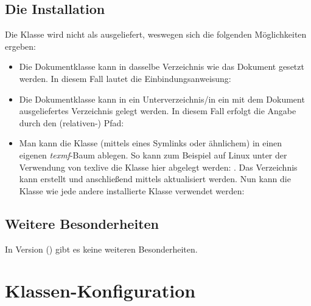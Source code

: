 \documentclass[useartcl,notoc]{sopra-paper}
\begin{document}
\subsection{Die Installation}
    Die Klasse wird nicht als  ausgeliefert, weswegen sich die
    folgenden Möglichkeiten ergeben:
    \begin{itemize}
        \item Die Dokumentklasse kann in dasselbe Verzeichnis wie das Dokument
                gesetzt werden. In diesem Fall lautet die Einbindungsanweisung:
        \item Die Dokumentklasse kann in ein Unterverzeichnis/in ein mit
                dem Dokument ausgeliefertes Verzeichnis gelegt werden. In
                diesem Fall erfolgt die Angabe durch den (relativen-) Pfad:
        \item Man kann die Klasse (mittels eines Symlinks oder ähnlichem)
              in einen eigenen \emph{texmf}-Baum ablegen.
              So kann zum Beispiel auf Linux unter der Verwendung von texlive
              die Klasse hier abgelegt werden: .
              Das Verzeichnis kann erstellt und anschließend mittels
               aktualisiert werden. Nun kann
              die Klasse wie jede andere installierte Klasse verwendet werden:
    \end{itemize}
    \subsection{Weitere Besonderheiten}
    In Version \thesopversion{} () gibt es keine weiteren
    Besonderheiten.

\section{Klassen-Konfiguration}
\end{document}
